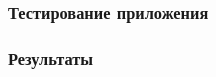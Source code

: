 \documentclass[xetex,t]{beamer}
\begin{document}
%
%
\begin{frame}
  \frametitle{Тестирование приложения}
\end{frame}


%
%
\begin{frame}
  \frametitle{Результаты}
\end{frame}


%
%
\begin{frame}[c]
\begin{center}
  \Huge\bfseries
  \color{ifmoblue}{Спасибо за внимание}
\end{center}
\end{frame}
\end{document}
